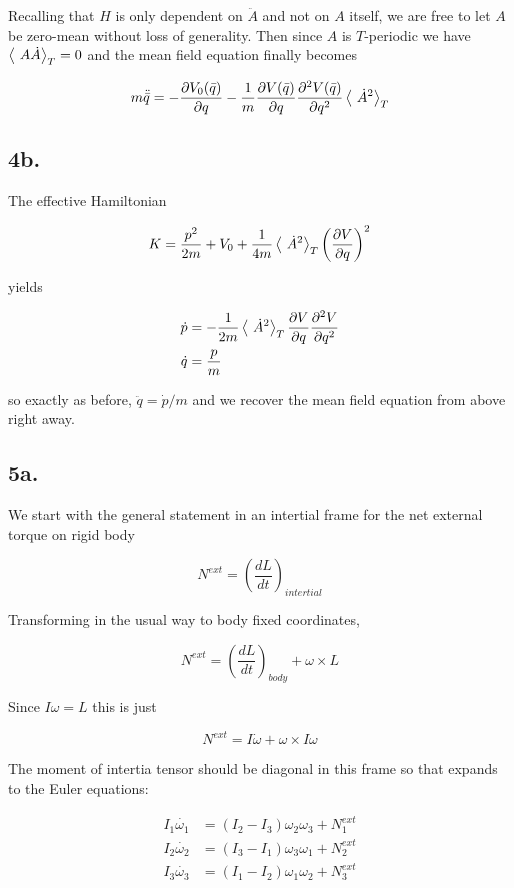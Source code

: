 \documentclass[12pt]{article}
\begin{document}
Recalling that \(H\) is only dependent on \( \ddot{A} \) and not on \(A\) itself, we are free to let \(A\) be zero-mean without loss of generality. Then since \(A\) is \(T\)-periodic we have \( \left\langle\ A\dot{A} \right\rangle_T = 0\) and the mean field equation finally becomes

\[ m\ddot{\bar{q}} = -\frac{\partial V_0(\bar{q})}{\partial q} - \frac{1}{m}\frac{\partial V(\bar{q})}{\partial q}\frac{\partial^2 V(\bar{q})}{\partial q^2}\left\langle\ \dot{A}^2 \right\rangle_T
\]

\subsection*{4b.}

The effective Hamiltonian 

\[K = \frac{p^2}{2m} + V_0 + \frac{1}{4m}\left\langle\ \dot{A}^2 \right\rangle_T\left( \frac{\partial V}{\partial q}\right)^2
\]

yields

\begin{align*}
\dot{p} &= -\frac{1}{2m}\left\langle\ \dot{A}^2 \right\rangle_T\frac{\partial V}{\partial q}\frac{\partial^2 V}{\partial q^2}\\
\dot{q} &= \frac{p}{m}
\end{align*}

so exactly as before, \(\ddot{q} = \dot{p}/m\) and we recover the mean field equation from above right away.

\subsection*{5a.}

We start with the general statement in an intertial frame for the net external torque on rigid body

\[N^{\textit{ext}} = \left(\frac{dL}{dt}\right)_\textit{intertial}
\]

Transforming in the usual way to body fixed coordinates,

\[ N^{\textit{ext}} = \left( \frac{dL}{dt}\right)_\textit{body} + \omega \times L
\]

Since \(I\omega = L\) this is just


\[N^{\textit{ext}} = I\dot{\omega} + \omega \times I\omega
\]

The moment of intertia tensor should be diagonal in this frame so that expands to the Euler equations:

\begin{align*}
I_1\dot{\omega_1} &= (I_2-I_3)\omega_2 \omega_3 + N^{\textit{ext}}_1 \\
I_2\dot{\omega_2} &= (I_3-I_1)\omega_3 \omega_1 + N^{\textit{ext}}_2 \\
I_3\dot{\omega_3} &= (I_1-I_2)\omega_1 \omega_2 + N^{\textit{ext}}_3
\end{align*}
\end{document}
